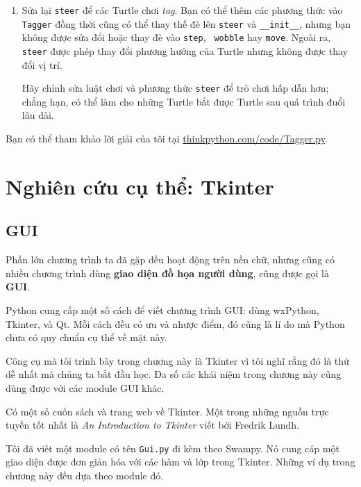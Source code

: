 \documentclass[11pt]{book}
\begin{document}
\begin{ex}
\begin{enumerate}
\item Sửa lại {\tt steer} để các Turtle chơi {\em tag}. Bạn có thể thêm các phương thức
  vào {\tt Tagger} đồng thời cũng có thể thay thế đè lên {\tt steer} và
  \verb"__init__", nhưng bạn không được sửa đổi hoặc thay đè vào {\tt step}, {\tt
    wobble} hay {\tt move}.  Ngoài ra, {\tt steer} được phép thay đổi 
  phương hướng của Turtle nhưng không được thay đổi vị trí.

Hãy chỉnh sửa luật chơi và phương thức {\tt steer} để trò chơi hấp dẫn hơn;
chẳng hạn, có thể làm cho những Turtle bắt được
Turtle sau quá trình đuổi lâu dài.

\end{enumerate}

Bạn có thể tham khảo lời giải của tôi tại \url{thinkpython.com/code/Tagger.py}.
\end{ex}



\chapter{Nghiên cứu cụ thể: Tkinter}

\section{GUI}

Phần lớn chương trình ta đã gặp đều hoạt động trên nền chữ, nhưng
cũng có nhiều chương trình dùng {\bf giao diện đồ họa người dùng}, cũng
được gọi là {\bf GUI}.


Python cung cấp một số cách để viết chương trình GUI:
dùng wxPython, Tkinter, và Qt. Mỗi cách đều có ưu và nhược điểm,
đó cũng là lí do mà Python chưa có quy chuẩn cụ thể về mặt này.

Công cụ mà tôi trình bày trong chương này là Tkinter vì tôi nghĩ rằng
đó là thứ dễ nhất mà chúng ta bắt đầu học. Đa số các khái niệm
trong chương này cũng dùng được với các module GUI khác.

Có một số cuốn sách và trang web về Tkinter. Một trong những
nguồn trực tuyến tốt nhất là {\em An Introduction to Tkinter}
viết bởi Fredrik Lundh.


Tôi đã viết một module có tên {\tt Gui.py} đi kèm theo
Swampy.  Nó cung cáp một giao diện được đơn giản hóa với các hàm
và lớp trong Tkinter.  Những ví dụ trong chương này đều
dựa theo module đó.
\end{document}
